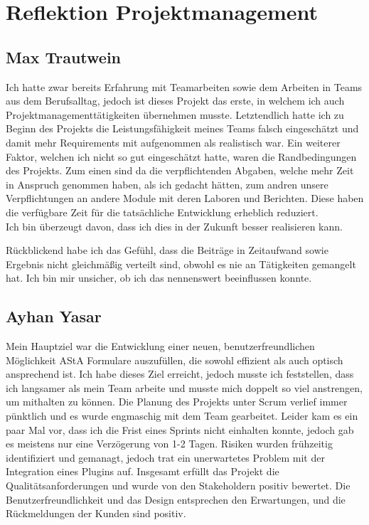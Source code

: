 \chapter{Reflektion Projektmanagement}\label{ch:reflektion-projektmanagement}


\section{Max Trautwein}

Ich hatte zwar bereits Erfahrung mit Teamarbeiten sowie dem Arbeiten in Teams aus dem Berufsalltag,
jedoch ist dieses Projekt das erste, in welchem ich auch Projektmanagementtätigkeiten übernehmen musste.
Letztendlich hatte ich zu Beginn des Projekts die Leistungsfähigkeit meines Teams falsch eingeschätzt und
damit mehr Requirements mit aufgenommen als realistisch war.
Ein weiterer Faktor, welchen ich nicht so gut eingeschätzt hatte, waren die Randbedingungen des Projekts.
Zum einen sind da die verpflichtenden Abgaben, welche mehr Zeit in Anspruch genommen haben, als ich gedacht hätten,
zum andren unsere Verpflichtungen an andere Module mit deren Laboren und Berichten.
Diese haben die verfügbare Zeit für die tatsächliche Entwicklung erheblich reduziert.\\
Ich bin überzeugt davon, dass ich dies in der Zukunft besser realisieren kann.

Rückblickend habe ich das Gefühl, dass die Beiträge in Zeitaufwand sowie Ergebnis nicht gleichmäßig verteilt sind,
obwohl es nie an Tätigkeiten gemangelt hat.
Ich bin mir unsicher, ob ich das nennenswert beeinflussen konnte.

\section{Ayhan Yasar}
Mein Hauptziel war die Entwicklung einer neuen, benutzerfreundlichen Möglichkeit \ac{AStA} Formulare auszufüllen, die sowohl effizient als auch optisch ansprechend ist.
Ich habe dieses Ziel erreicht, jedoch musste ich feststellen, dass ich langsamer als mein Team arbeite und musste mich doppelt so viel anstrengen, um mithalten zu können.
Die Planung des Projekts unter Scrum verlief immer pünktlich und es wurde engmaschig mit dem Team gearbeitet. Leider kam es ein paar Mal vor, dass ich die Frist eines Sprints nicht einhalten konnte, 
jedoch gab es meistens nur eine Verzögerung von 1-2 Tagen. 
Risiken wurden frühzeitig identifiziert und gemanagt, jedoch trat ein unerwartetes Problem mit der Integration eines Plugins auf.
Insgesamt erfüllt das Projekt die Qualitätsanforderungen und wurde von den Stakeholdern positiv bewertet. Die Benutzerfreundlichkeit und das Design entsprechen den Erwartungen, und die Rückmeldungen der Kunden sind positiv.


